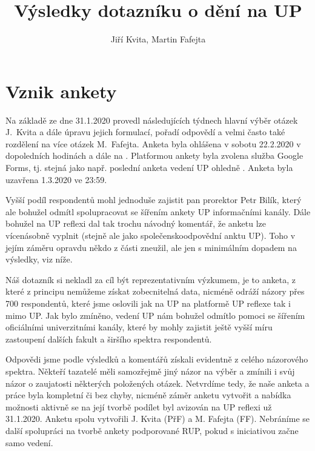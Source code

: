 \documentclass[a4paper,twoside]{article}
\author{Jiří Kvita, Martin Fafejta}
\title{Výsledky dotazníku o dění na UP}
\begin{document}
\maketitle

\tableofcontents
\newpage

\section{Vznik ankety}

Na základě  ze dne 31.1.2020 provedl následujících týdnech hlavní výběr otázek J.~Kvita a dále úpravu jejich formulací, pořadí odpovědí a velmi často také rozdělení na více otázek M.~Fafejta.
Anketa byla ohlášena v sobotu 22.2.2020  v dopoledních hodinách  a dále na . Platformou ankety byla zvolena služba Google Forms, tj. stejná jako např. poslední anketa vedení UP ohledně . Anketa byla uzavřena 1.3.2020 ve 23:59.

Vyšší podíl respondentů mohl jednoduše zajistit pan prorektor Petr Bilík, který ale bohužel odmítl spolupracovat se šířením ankety UP informačními kanály. Dále bohužel na UP reflexi dal tak trochu návodný komentář, že anketu lze vícenásobně vyplnit (stejně ale jako společenskoodpovědní anktu UP). Toho v jejím záměru opravdu někdo z části zneužil, ale jen s minimálním dopadem na výsledky, viz níže.

Náš dotazník si nekladl za cíl být reprezentativním výzkumem, je to anketa, z které z principu nemůžeme získat zobecnitelná data, nicméně odráží názory přes 700 respondentů, které jsme oslovili jak na UP na platformě UP reflexe tak i mimo UP. Jak bylo zmíněno, vedení UP nám bohužel odmítlo pomoci se šířením oficiálními univerzitními kanály, které by mohly zajistit ještě vyšší míru zastoupení dalších fakult a širšího spektra respondentů.

Odpovědi jsme podle výsledků a komentářů získali evidentně z celého názorového spektra. Někteří tazatelé měli samozřejmě jiný názor na výběr a zmínili i svůj názor o zaujatosti některých položených otázek. Netvrdíme tedy, že naše anketa a práce byla kompletní či bez chyby, nicméně záměr anketu vytvořit a nabídka možnosti aktivně se na její tvorbě podílet byl avizován na UP reflexi už 31.1.2020. Anketu spolu vytvořili J. Kvita (PřF) a M. Fafejta (FF). Nebráníme se další spolupráci na tvorbě ankety podporované RUP, pokud s iniciativou začne samo vedení.
\end{document}
